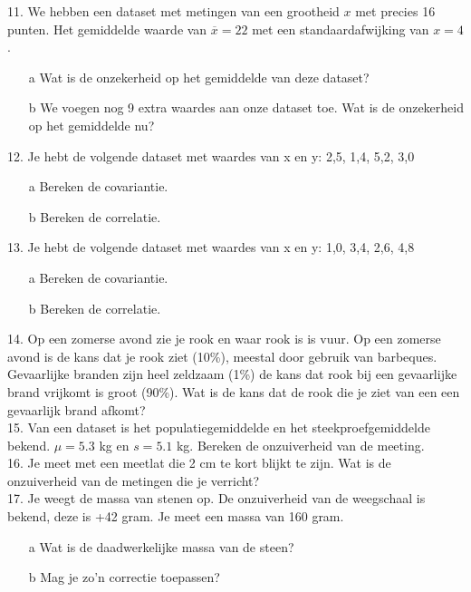 11. We hebben een dataset met metingen van een grootheid $x$ met precies 16 punten. Het gemiddelde waarde van $\overline{x} = 22$ met een standaardafwijking van $x = 4 $.
\begin{itemize}
\item[a] Wat is de onzekerheid op het gemiddelde van deze dataset?
\item[b] We voegen nog 9 extra waardes aan onze dataset toe. Wat is de onzekerheid op het gemiddelde nu?
\end{itemize}



12. Je hebt de volgende dataset met waardes van x en y:
 {2,5}, {1,4}, {5,2}, {3,0}\\
\begin{itemize}
\item[a] Bereken de covariantie.
\item[b] Bereken de correlatie.
\end{itemize}



13. Je hebt de volgende dataset met waardes van x en y:
{1,0}, {3,4}, {2,6}, {4,8}\\
\begin{itemize}
 \item[a] Bereken de covariantie.
 \item[b] Bereken de correlatie.
\end{itemize}
   

14. Op een zomerse avond zie je rook en waar rook is is vuur. Op een zomerse avond is de kans dat je rook ziet (10\%), meestal door gebruik van barbeques. Gevaarlijke branden zijn heel zeldzaam (1\%) de kans dat rook bij een gevaarlijke brand vrijkomt is groot (90\%). Wat is de kans dat de rook die je ziet van een een gevaarlijk brand afkomt?\\


15. Van een dataset is het populatiegemiddelde en het steekproefgemiddelde bekend. $\mu = 5.3 $ kg en $s = 5.1$ kg. Bereken de onzuiverheid van de meeting.\\
 

16. Je meet met een meetlat die 2 cm te kort blijkt te zijn. Wat is de onzuiverheid van de metingen die je verricht?\\


17. Je weegt de massa van stenen op. De onzuiverheid van de weegschaal is bekend, deze is +42 gram. Je meet een massa van 160 gram.
\begin{itemize}
\item[a]  Wat is de daadwerkelijke massa van de steen?
\item[b] Mag je zo'n correctie toepassen?
\end{itemize}


